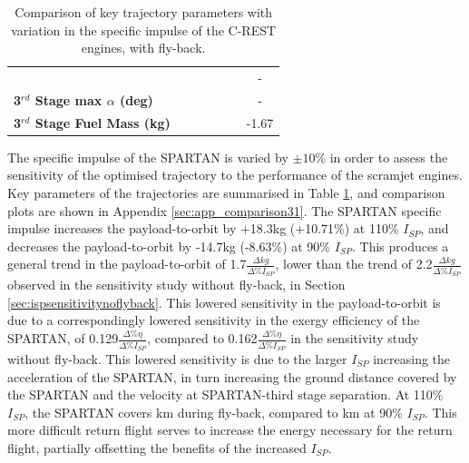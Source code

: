 \begin{table}[ht]
\begin{tabular}{l c c c c c c}
		& \thirdqOverFiveIspNinety
		& \thirdqOverFiveIspNinetyFive
		& \thirdqOverFiveIspStandard
		& \thirdqOverFiveIspOneHundredFive
		& \thirdqOverFiveIspOneHundredTen
		& -
		\\
		\textbf{3$^{rd}$ Stage max $\alpha$ (deg)}
		& \thirdmaxAoAIspNinety
		& \thirdmaxAoAIspNinetyFive
		& \thirdmaxAoAIspStandard
		& \thirdmaxAoAIspOneHundredFive
		& \thirdmaxAoAIspOneHundredTen
		& -
		\\
		\textbf{3$^{rd}$ Stage Fuel Mass (kg)}
		& \thirdmFuelIspNinety
		& \thirdmFuelIspNinetyFive
		& \thirdmFuelIspStandard
		& \thirdmFuelIspOneHundredFive
		& \thirdmFuelIspOneHundredTen
		&-1.67
		\\
		\hline 
	\end{tabular} 
	\caption{Comparison of key trajectory parameters with variation in the specific impulse of the C-REST engines, with fly-back.}
	\label{tab:comparison31}
\end{table}

The specific impulse of the SPARTAN is varied by $\pm10\%$ in order to assess the sensitivity of the optimised trajectory to the performance of the scramjet engines. 
Key parameters of the trajectories are summarised in Table \ref{tab:comparison31}, and comparison plots are shown in Appendix \ref{sec:app_comparison31}.
The SPARTAN specific impulse increases the payload-to-orbit by +18.3kg (+10.71\%) at 110\% $I_{SP}$, and decreases the payload-to-orbit by -14.7kg (-8.63\%) at 90\% $I_{SP}$. 
This produces a general trend in the payload-to-orbit of 1.7$\frac{\Delta kg}{\Delta \%I_{SP} }$, lower than the trend of 2.2$\frac{\Delta kg}{\Delta \%I_{SP} }$ observed in the sensitivity study without fly-back, in Section \ref{sec:ispsensitivitynoflyback}.
This lowered sensitivity in the payload-to-orbit is due to a correspondingly lowered sensitivity in the exergy efficiency of the SPARTAN, of 0.129$\frac{\Delta \% \eta}{\Delta \%I_{SP} }$, compared to 0.162$\frac{\Delta \% \eta}{\Delta \%I_{SP} }$ in the sensitivity study without fly-back. This lowered sensitivity is due to the larger $I_{SP}$ increasing the acceleration of the SPARTAN, in turn increasing the ground distance covered by the SPARTAN and the velocity at SPARTAN-third stage separation. At 110\% $I_{SP}$, the SPARTAN covers \returnDistIspOneHundredTen km during fly-back, compared to \returnDistIspNinety km at 90\% $I_{SP}$. This more difficult return flight serves to increase the energy necessary for the return flight, partially offsetting the benefits of the increased $I_{SP}$. 

